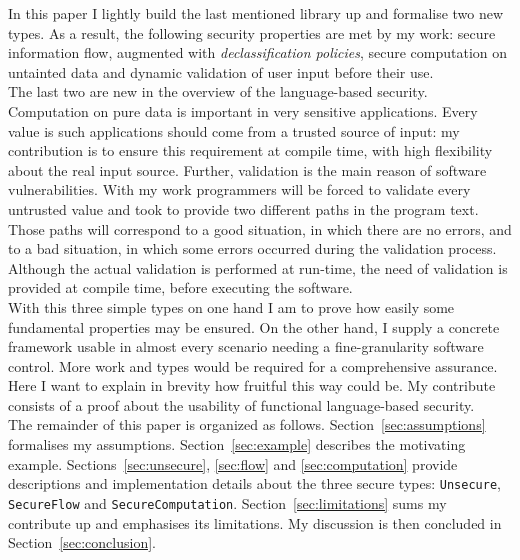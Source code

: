 In this paper I lightly build the last mentioned library up and formalise two new types. As a result, the following security properties are met by my work: secure information flow, augmented with \textit{declassification policies}, secure computation on untainted data and dynamic validation of user input before their use. \\
The last two are new in the overview of the language-based security. Computation on pure data is important in very sensitive applications. Every value is such applications should come from a trusted source of input: my contribution is to ensure this requirement at compile time, with high flexibility about the real input source. Further, validation is the main reason of software vulnerabilities. With my work programmers will be forced to validate every untrusted value and took to provide two different paths in the program text. Those paths will correspond to a good situation, in which there are no errors, and to a bad situation, in which some errors occurred during the validation process. Although the actual validation is performed at run-time, the need of validation is provided at compile time, before executing the software. \\
With this three simple types on one hand I am to prove how easily some fundamental properties may be ensured. On the other hand, I supply a concrete framework usable in almost every scenario needing a fine-granularity software control. More work and types would be required for a comprehensive assurance. Here I want to explain in brevity how fruitful this way could be. My contribute consists of a proof about the usability of functional language-based security. \\
The remainder of this paper is organized as follows. Section~\ref{sec:assumptions} formalises my assumptions. Section~\ref{sec:example} describes the motivating example. Sections~\ref{sec:unsecure}, \ref{sec:flow} and \ref{sec:computation} provide descriptions and implementation details about the three secure types: \texttt{Unsecure}, \texttt{SecureFlow} and \texttt{SecureComputation}. Section~\ref{sec:limitations} sums my contribute up and emphasises its limitations. My discussion is then concluded in Section~\ref{sec:conclusion}.